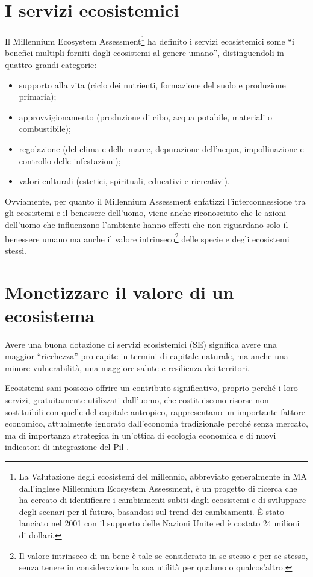 \documentclass[14pt,a4paper]{article}
\begin{document}
	\section{I servizi ecosistemici}
		Il Millennium Ecosystem Assessment\footnote{La Valutazione degli ecosistemi del millennio, abbreviato generalmente in MA dall'inglese Millennium Ecosystem Assessment, è un progetto di ricerca che ha cercato di identificare i cambiamenti subiti dagli ecosistemi e di sviluppare degli scenari per il futuro, basandosi sul trend dei cambiamenti. È stato lanciato nel 2001 con il supporto delle Nazioni Unite ed è costato 24 milioni di dollari.} \cite{MEA_EcosystemsAndHumanWellBeing:Synthesis} ha definito i servizi ecosistemici some ``i benefici multipli forniti dagli ecosistemi al genere umano'', distinguendoli in quattro grandi categorie:
		\begin{itemize}
			\item supporto alla vita (ciclo dei nutrienti, formazione del suolo e produzione primaria);
			\item approvvigionamento (produzione di cibo, acqua potabile, materiali o combustibile);
			\item regolazione (del clima e delle maree, depurazione dell'acqua, impollinazione e controllo delle infestazioni);
			\item valori culturali (estetici, spirituali, educativi e ricreativi).
		\end{itemize}
		Ovviamente, per quanto il Millennium Assessment enfatizzi l'interconnessione tra gli ecosistemi e il benessere dell'uomo, viene anche riconosciuto che le azioni dell'uomo che influenzano l'ambiente hanno effetti che non riguardano solo il benessere umano ma anche il valore intrinseco\footnote{ Il valore intrinseco di un bene è tale se considerato in se stesso e per se stesso, senza tenere in considerazione la sua utilità per qualuno o qualcos'altro.	} delle specie e degli ecosistemi stessi.
	
	\section{Monetizzare il valore di un ecosistema}

	Avere una buona dotazione di servizi ecosistemici (SE) significa avere una maggior ``ricchezza'' pro capite in termini di capitale naturale, ma anche una minore  vulnerabilità, una maggiore salute e resilienza dei territori.
	
	Ecosistemi sani possono offrire un contributo significativo, proprio perché i loro servizi, gratuitamente utilizzati dall'uomo, che costituiscono risorse non sostituibili con quelle del capitale antropico, rappresentano un importante fattore economico, attualmente ignorato dall'economia tradizionale perché senza mercato, ma di importanza strategica in un'ottica di ecologia economica e di nuovi indicatori di integrazione del Pil \cite{oltre_il_PIL}.
	
\end{document}
